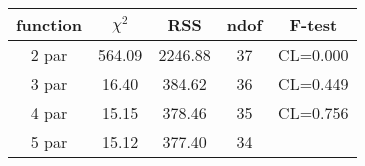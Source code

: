 \begin{tabular}{c|c|c|c|c}
function & $\chi^2$ & RSS & ndof & F-test \\
\hline
2 par & 564.09 & 2246.88 & 37 & CL=0.000 \\
3 par & 16.40 & 384.62 & 36 & CL=0.449 \\
4 par & 15.15 & 378.46 & 35 & CL=0.756 \\
5 par & 15.12 & 377.40 & 34 & \\
\hline
\end{tabular}